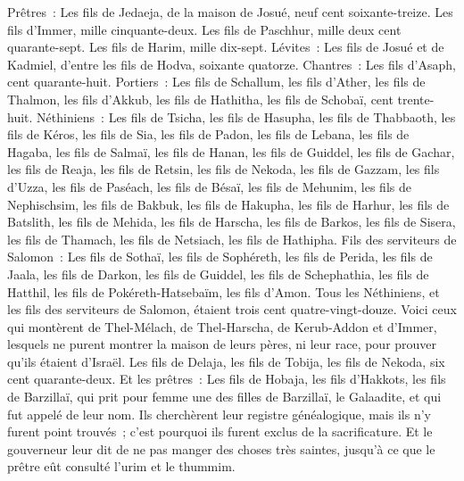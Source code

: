 \begin{multicols}{2}
Prêtres~: Les fils de Jedaeja, de la maison de Josué, neuf cent soixante-treize.
Les fils d'Immer, mille cinquante-deux.
Les fils de Paschhur, mille deux cent quarante-sept.
Les fils de Harim, mille dix-sept.
Lévites~: Les fils de Josué et de Kadmiel, d'entre les fils de Hodva, soixante quatorze.
Chantres~: Les fils d'Asaph, cent quarante-huit.
Portiers~: Les fils de Schallum, les fils d'Ather, les fils de Thalmon, les fils d'Akkub, les fils de Hathitha, les fils de Schobaï, cent trente-huit.
Néthiniens~: Les fils de Tsicha, les fils de Hasupha, les fils de Thabbaoth,
les fils de Kéros, les fils de Sia, les fils de Padon,
les fils de Lebana, les fils de Hagaba, les fils de Salmaï,
les fils de Hanan, les fils de Guiddel, les fils de Gachar,
les fils de Reaja, les fils de Retsin, les fils de Nekoda,
les fils de Gazzam, les fils d'Uzza, les fils de Paséach,
les fils de Bésaï, les fils de Mehunim, les fils de Nephischsim,
les fils de Bakbuk, les fils de Hakupha, les fils de Harhur,
les fils de Batslith, les fils de Mehida, les fils de Harscha,
les fils de Barkos, les fils de Sisera, les fils de Thamach,
les fils de Netsiach, les fils de Hathipha.
Fils des serviteurs de Salomon~: Les fils de Sothaï, les fils de Sophéreth, les fils de Perida,
les fils de Jaala, les fils de Darkon, les fils de Guiddel,
les fils de Schephathia, les fils de Hatthil, les fils de Pokéreth-Hatsebaïm, les fils d'Amon.
Tous les Néthiniens, et les fils des serviteurs de Salomon, étaient trois cent quatre-vingt-douze.
Voici ceux qui montèrent de Thel-Mélach, de Thel-Harscha, de Kerub-Addon et d'Immer, lesquels ne purent montrer la maison de leurs pères, ni leur race, pour prouver qu'ils étaient d'Israël.
Les fils de Delaja, les fils de Tobija, les fils de Nekoda, six cent quarante-deux.
Et les prêtres~: Les fils de Hobaja, les fils d'Hakkots, les fils de Barzillaï, qui prit pour femme une des filles de Barzillaï, le Galaadite, et qui fut appelé de leur nom.
Ils cherchèrent leur registre généalogique, mais ils n'y furent point trouvés~; c'est pourquoi ils furent exclus de la sacrificature.
Et le gouverneur leur dit de ne pas manger des choses très saintes, jusqu'à ce que le prêtre eût consulté l'urim et le thummim.

\end{multicols}
